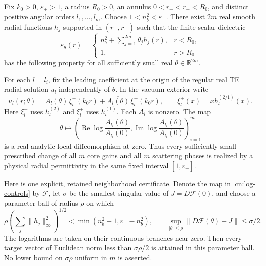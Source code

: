 \begin{theorem}
\label{cn:local-synthesis}
Fix $k_0>0$, $\varepsilon_+>1$, a radius $R_0>0$, an annulus
$0<r_-<r_+<R_0$, and distinct positive angular orders
$l_1,\ldots,l_m$.  Choose $1<n_b^2<\varepsilon_+$.
There exist $2m$ real smooth radial functions $h_j$ supported in
$(r_-,r_+)$ such that the finite scalar dielectric
\begin{equation}\label{cn:control-material}
 \varepsilon_\theta(r)=
 \begin{cases}
 n_b^2+\sum_{j=1}^{2m}\theta_jh_j(r),&r<R_0,\\
 1,&r>R_0
 \end{cases}
\end{equation}
has the following property for all sufficiently small real
$\theta\in\mathbb R^{2m}$.

For each $l=l_i$, fix the leading coefficient at the origin of the
regular real TE radial solution $u_l$ independently of $\theta$.
In the vacuum exterior write
\begin{equation}\label{cn:incoming-coefficient}
 u_l(r;\theta)=A_l(\theta)\,\xi_l^-(k_0r)
           +\overline{A_l(\theta)}\,\xi_l^+(k_0r),
 \qquad \xi_l^\pm(x)=x h_l^{(2/1)}(x).
\end{equation}
Here $\xi_l^-$ uses $h_l^{(2)}$ and $\xi_l^+$ uses
$h_l^{(1)}$.  Each $A_l$ is nonzero.  The map
\begin{equation}\label{cn:log-controls}
 \theta\longmapsto
 \left(\operatorname{Re}\log\frac{A_{l_i}(\theta)}{A_{l_i}(0)},
       \operatorname{Im}\log\frac{A_{l_i}(\theta)}{A_{l_i}(0)}
 \right)_{i=1}^m
\end{equation}
is a real-analytic local diffeomorphism at zero.  Thus every sufficiently
small prescribed change of all $m$ core gains and all $m$ scattering
phases is realized by a physical radial permittivity in the same fixed
interval $[1,\varepsilon_+]$.

Here is one explicit, retained neighborhood certificate.  Denote the
map in \eqref{cn:log-controls} by $\mathcal F$, let
$\sigma$ be the smallest singular value of $J=D\mathcal F(0)$,
and choose a parameter ball of radius $\rho$ on which
\begin{equation}\label{cn:control-radius}
 \rho\left(\sum_j\|h_j\|_\infty^2\right)^{1/2}
 <\min(n_b^2-1,\varepsilon_+-n_b^2),\qquad
 \sup_{|\theta|\leq\rho}\|D\mathcal F(\theta)-J\|
 \leq\sigma/2.
\end{equation}
The logarithms are taken on their continuous branches near zero.
Then every target vector of Euclidean norm less than
$\sigma\rho/2$ is attained in this parameter ball.
No lower bound on $\sigma\rho$ uniform in $m$ is asserted.
\end{theorem}

